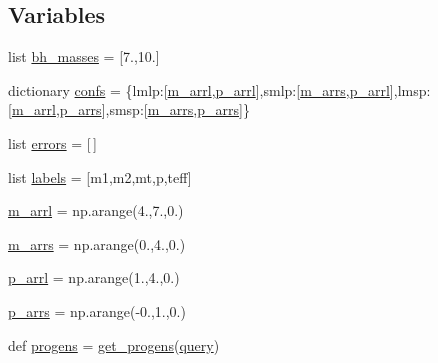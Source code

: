 \subsection*{Variables}
\begin{DoxyCompactItemize}
\item 
list \hyperlink{namespacequery_aef6e5a079f78ef199b5c8c5e8018138c}{bh\+\_\+masses} = \mbox{[}7.,10.\mbox{]}
\item 
dictionary \hyperlink{namespacequery_aca5011236a28a00635a5bfdc3b7df6f6}{confs} = \{\textquotesingle{}lmlp\textquotesingle{}\+:\mbox{[}\hyperlink{namespacequery_aafb51e0017c73f87bbe2699321c6a5fd}{m\+\_\+arrl},\hyperlink{namespacequery_aa2c4078b994af1c9ad5f0821590d0eea}{p\+\_\+arrl}\mbox{]},\textquotesingle{}smlp\textquotesingle{}\+:\mbox{[}\hyperlink{namespacequery_ac323a9cbb94178daa2549f554bd92baa}{m\+\_\+arrs},\hyperlink{namespacequery_aa2c4078b994af1c9ad5f0821590d0eea}{p\+\_\+arrl}\mbox{]},\textquotesingle{}lmsp\textquotesingle{}\+:\mbox{[}\hyperlink{namespacequery_aafb51e0017c73f87bbe2699321c6a5fd}{m\+\_\+arrl},\hyperlink{namespacequery_acb09178e64b20ef1abc8365eba1ca4fc}{p\+\_\+arrs}\mbox{]},\textquotesingle{}smsp\textquotesingle{}\+:\mbox{[}\hyperlink{namespacequery_ac323a9cbb94178daa2549f554bd92baa}{m\+\_\+arrs},\hyperlink{namespacequery_acb09178e64b20ef1abc8365eba1ca4fc}{p\+\_\+arrs}\mbox{]}\}
\item 
list \hyperlink{namespacequery_adf94822c1d3c878c7e35db9412bb1d66}{errors} = \mbox{[}$\,$\mbox{]}
\item 
list \hyperlink{namespacequery_a0f59db5220a1b7eca136f6e360055d03}{labels} = \mbox{[}\textquotesingle{}m1\textquotesingle{},\textquotesingle{}m2\textquotesingle{},\textquotesingle{}mt\textquotesingle{},\textquotesingle{}p\textquotesingle{},\textquotesingle{}teff\textquotesingle{}\mbox{]}
\item 
\hyperlink{namespacequery_aafb51e0017c73f87bbe2699321c6a5fd}{m\+\_\+arrl} = np.\+arange(4.,7.,0.)
\item 
\hyperlink{namespacequery_ac323a9cbb94178daa2549f554bd92baa}{m\+\_\+arrs} = np.\+arange(0.,4.,0.)
\item 
\hyperlink{namespacequery_aa2c4078b994af1c9ad5f0821590d0eea}{p\+\_\+arrl} = np.\+arange(1.,4.,0.)
\item 
\hyperlink{namespacequery_acb09178e64b20ef1abc8365eba1ca4fc}{p\+\_\+arrs} = np.\+arange(-\/0.,1.,0.)
\item 
def \hyperlink{namespacequery_aadb205048dceb51ed98dc76b0cbc9d00}{progens} = \hyperlink{namespacequery_aa6657f1df72e61cb1a20d05df95d7dec}{get\+\_\+progens}(\hyperlink{namespacequery_a7077167865224233566753fc78aadb36}{query})

\end{DoxyCompactItemize}
